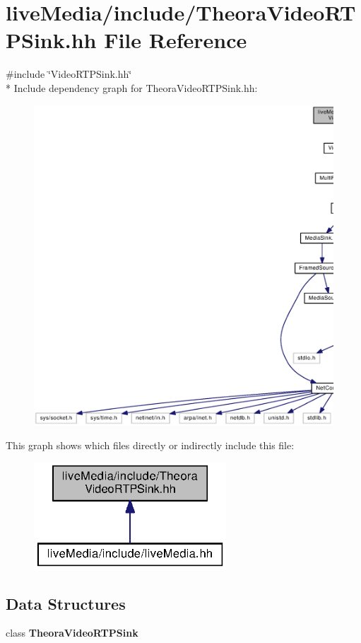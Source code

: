 \section{live\+Media/include/\+Theora\+Video\+R\+T\+P\+Sink.hh File Reference}
\label{TheoraVideoRTPSink_8hh}
{\ttfamily \#include \char`\"{}Video\+R\+T\+P\+Sink.\+hh\char`\"{}}\\*
Include dependency graph for Theora\+Video\+R\+T\+P\+Sink.\+hh\+:
\nopagebreak
\begin{figure}[H]
\begin{center}
\leavevmode
\includegraphics[width=350pt]{TheoraVideoRTPSink_8hh__incl}
\end{center}
\end{figure}
This graph shows which files directly or indirectly include this file\+:
\nopagebreak
\begin{figure}[H]
\begin{center}
\leavevmode
\includegraphics[width=204pt]{TheoraVideoRTPSink_8hh__dep__incl}
\end{center}
\end{figure}
\subsection*{Data Structures}
\begin{DoxyCompactItemize}
\item 
class {\bf Theora\+Video\+R\+T\+P\+Sink}
\end{DoxyCompactItemize}
